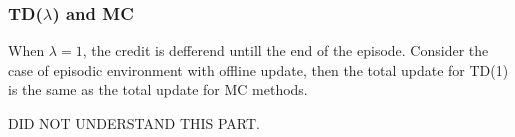 \subsubsection*{TD(\(\lambda \)) and MC}
When \(\lambda = 1\), the credit is defferend untill the end of the episode. Consider the 
case of episodic environment with offline update, then the total update for TD(1) is the same
as the total update for MC methods.
\begin{note}
    DID NOT UNDERSTAND THIS PART.
\end{note}